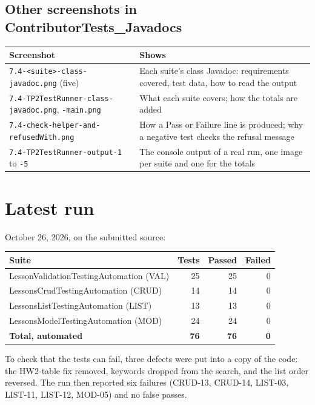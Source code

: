 \documentclass[10pt]{article}
\begin{document}
\begin{small}

\end{small}

\subsection*{Other screenshots in ContributorTests\_Javadocs}
\begin{tabularx}{\linewidth}{@{}l X@{}}
\toprule
\textbf{Screenshot} & \textbf{Shows} \\
\midrule
\texttt{7.4-<suite>-class-javadoc.png} (five) & Each suite's class Javadoc: requirements covered, test data, how to read the output \\
\texttt{7.4-TP2TestRunner-class-javadoc.png}, \texttt{-main.png} & What each suite covers; how the totals are added \\
\texttt{7.4-check-helper-and-refusedWith.png} & How a Pass or Failure line is produced; why a negative test checks the refusal message \\
\texttt{7.4-TP2TestRunner-output-1} to \texttt{-5} & The console output of a real run, one image per suite and one for the totals \\
\bottomrule
\end{tabularx}

\section*{Latest run}
October 26, 2026, on the submitted source:

\begin{tabularx}{\linewidth}{@{}X r r r@{}}
\toprule
\textbf{Suite} & \textbf{Tests} & \textbf{Passed} & \textbf{Failed} \\
\midrule
LessonValidationTestingAutomation (VAL) & 25 & 25 & 0 \\
LessonsCrudTestingAutomation (CRUD) & 14 & 14 & 0 \\
LessonsListTestingAutomation (LIST) & 13 & 13 & 0 \\
LessonsModelTestingAutomation (MOD) & 24 & 24 & 0 \\
\midrule
\textbf{Total, automated} & \textbf{76} & \textbf{76} & \textbf{0} \\
\bottomrule
\end{tabularx}

To check that the tests can fail, three defects were put into a copy of the code: the HW2-table
fix removed, keywords dropped from the search, and the list order reversed. The run then reported
six failures (CRUD-13, CRUD-14, LIST-03, LIST-11, LIST-12, MOD-05) and no false passes.
\end{document}
